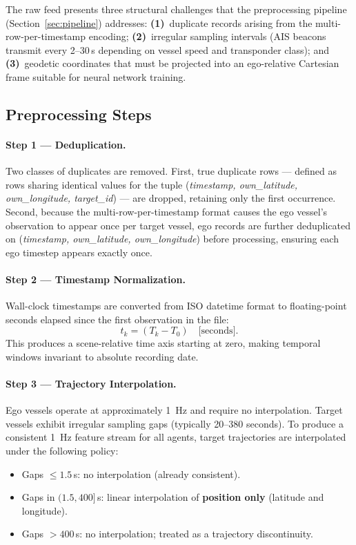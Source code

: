 \documentclass[12pt, a4paper]{article}
\begin{document}
  The raw feed presents three structural challenges that the preprocessing pipeline
  (Section~\ref{sec:pipeline}) addresses:
  \textbf{(1)}~duplicate records arising from the multi-row-per-timestamp encoding;
  \textbf{(2)}~irregular sampling intervals (AIS beacons transmit every 2–30\,s depending
  on vessel speed and transponder class); and
  \textbf{(3)}~geodetic coordinates that must be projected into an ego-relative Cartesian
  frame suitable for neural network training.

  \subsection{Preprocessing Steps}

  \paragraph{Step 1 — Deduplication.}
  Two classes of duplicates are removed. First, true duplicate rows — defined as rows sharing identical values for the tuple (\textit{timestamp, own\_latitude, own\_longitude, target\_id}) — are dropped,
  retaining only the first occurrence. Second, because the multi-row-per-timestamp format causes the ego vessel's observation to appear once per target vessel, ego records are further deduplicated on
  (\textit{timestamp, own\_latitude, own\_longitude}) before processing, ensuring each ego timestep appears exactly once.

  \paragraph{Step 2 — Timestamp Normalization.}
  Wall-clock timestamps are converted from ISO datetime format to floating-point seconds elapsed since the first observation in the file:
  \[
      t_k = (T_k - T_0) \quad \text{[seconds]}.
  \]
  This produces a scene-relative time axis starting at zero, making temporal windows invariant to absolute recording date.

  \paragraph{Step 3 — Trajectory Interpolation.}
  Ego vessels operate at approximately 1~Hz and require no interpolation. Target vessels exhibit irregular sampling gaps (typically 20–380 seconds). To produce a consistent 1~Hz feature stream for all agents,
  target trajectories are interpolated under the following policy:
  \begin{itemize}
      \item Gaps $\leq 1.5$\,s: no interpolation (already consistent).
      \item Gaps in $(1.5, 400]$\,s: linear interpolation of \textbf{position only} (latitude and longitude).
      \item Gaps $> 400$\,s: no interpolation; treated as a trajectory discontinuity.
  \end{itemize}
\end{document}
